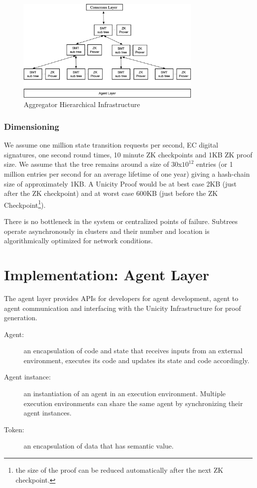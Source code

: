 \documentclass{article}
\begin{document}
\begin{figure}[htbp]
    \centering
    \includegraphics[width=0.8\textwidth]{SMT-Infra.png}
    \caption{Aggregator Hierarchical Infrastructure}
    \label{fig:SMT-Infra}
\end{figure}

\subsubsection{Dimensioning}

We assume one million state transition requests per second, EC digital signatures, one second round times, 10 minute ZK checkpoints and 1KB ZK proof size. We assume that the tree remains around a size of 30x$10^{12}$ entries (or 1 million entries per second for an average lifetime of one year) giving a hash-chain size of approximately 1KB.
A Unicity Proof would be at best case 2KB (just after the ZK checkpoint) and at worst case 600KB (just before the ZK Checkpoint\footnote{the size of the proof can be reduced automatically after the next ZK checkpoint.}).

There is no bottleneck in the system or centralized points of failure. Subtrees operate asynchronously in clusters and their number and location is algorithmically optimized for network conditions.

\section{Implementation: Agent Layer}

The agent layer provides APIs for developers for agent development, agent to agent communication and interfacing with the Unicity Infrastructure for proof generation.

\begin{description}
    \item[Agent:] an encapsulation of code and state that receives inputs from an external environment, executes its code and updates its state and code accordingly.
    \item[Agent instance:] an instantiation of an agent in an execution environment. Multiple execution environments can share the same agent by synchronizing their agent instances.
    \item[Token:] an encapsulation of data that has semantic value.
\end{description}
\end{document}
